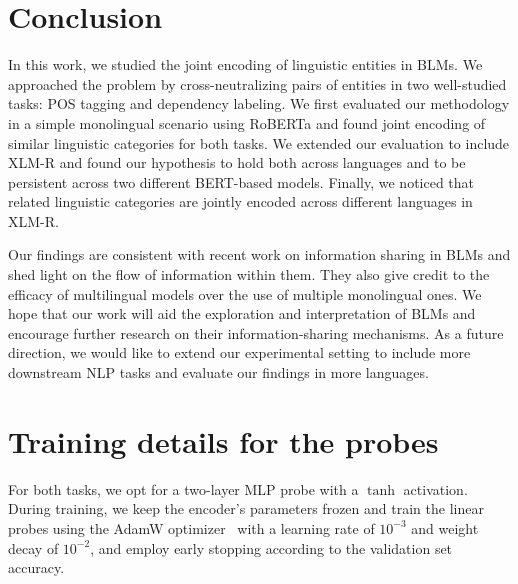 \documentclass[11pt,a4paper]{article}
\begin{document}
\section{Conclusion}

In this work, we studied the joint encoding of linguistic entities in BLMs. We approached the problem by cross-neutralizing pairs of entities in two well-studied tasks: POS tagging and dependency labeling. We first evaluated our methodology in a simple monolingual scenario using RoBERTa and found joint encoding of similar linguistic categories for both tasks. We extended our evaluation to include XLM-R and found our hypothesis to hold both across languages and to be persistent across two different BERT-based models. Finally, we noticed that related linguistic categories are jointly encoded across different languages in XLM-R.

Our findings are consistent with recent work on information sharing in BLMs and shed light on the flow of information within them. They also give credit to the efficacy of multilingual models over the use of multiple monolingual ones. We hope that our work will aid the exploration and interpretation of BLMs and encourage further research on their information-sharing mechanisms. As a future direction, we would like to extend our experimental setting to include more downstream NLP tasks and evaluate our findings in more languages.




\clearpage

\appendix

\section{Training details for the probes}
\label{app:probe_training}
For both tasks, we opt for a two-layer MLP probe with a $\tanh$ activation. During training, we keep the encoder’s parameters frozen and train the linear probes using the AdamW optimizer~\citep{loshchilov_decoupled_2019} with a learning rate of $10^{-3}$ and weight decay of $10^{-2}$, and employ early stopping according to the validation set accuracy.
\end{document}
